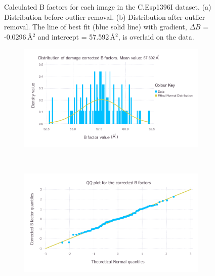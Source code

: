 \begin{figure}
\begin{subfigure}[b]{1.0\textwidth}
            \caption{}
            \label{fig:B factors per image after outlier removal - C.Esp1396I}
    \end{subfigure}
    \caption[Calculated B factors for each image in the C.Esp1396I dataset.]{Calculated B factors for each image in the C.Esp1396I dataset.
    (a) Distribution before outlier removal.
    (b) Distribution after outlier removal.
    The line of best fit (blue solid line) with gradient, $\Delta B$ = -0.0296$\,$\AA$^2$ and intercept = 57.592$\,$\AA$^2$, is overlaid on the data.}
    \label{fig:B factors per image - C.Esp1396I}
\end{figure}

\begin{figure}
    \centering
    \begin{subfigure}[b]{1.0\textwidth}
            \centering
            \includegraphics[width=\textwidth]{figures/datared/BFac_Distribution_cprot.pdf}
            \caption{}
            \label{fig:Damage corrected B factor distribution - C.Esp1396I}
    \end{subfigure}
    \\
    \begin{subfigure}[b]{1.0\textwidth}
            \centering
            \includegraphics[width=\textwidth]{figures/datared/BFac_QQplot_cprot.pdf}

\end{subfigure}
\end{figure}
